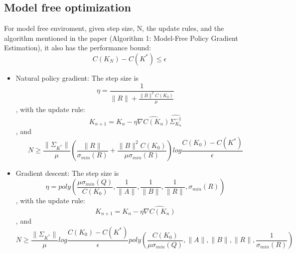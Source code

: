 \subsection{Model free optimization}
\begin{theorem}
For model free enviroment, given step size, N, the update rules, and the algorithm mentioned in the paper (Algorithm 1: Model-Free Policy Gradient Estimation), it also has the performance bound:
\begin{equation}
    C(K_N)-C(K^*)\leq\epsilon
\end{equation}\newline
\begin{itemize}
    \item Natural policy gradient:
The step size is
\begin{equation}
\eta = \frac{1}{\|R\|+\frac{\|B\|^2C(K_0)}{\mu}}
\end{equation}\newline
, with the update rule:
\begin{equation}
{K_{n+1}} = {K_n} - \eta\hat{\nabla{C}({K_n})}\hat{\Sigma_{K_n}^{-1}}
\end{equation}\newline
, and 
\begin{equation}
N\geq\frac{\|\Sigma_{K^*}\|}{\mu}(\frac{\|R\|}{\sigma_{min}(R)}+\frac{\|B\|^2C(K_0)}{\mu\sigma_{min}(R)})log\frac{C(K_0)-C(K^*)}{\epsilon}
\end{equation}\newline   
    \item Gradient descent:\newline
The step size is 
\begin{equation}
\eta = poly(\frac{\mu\sigma_{min}(Q)}{C(K_0)},\frac{1}{\|A\|},\frac{1}{\|B\|},\frac{1}{\|R\|},\sigma_{min}(R))
\end{equation}\newline
, with the update rule:
\begin{equation}
{K_{n+1}} = {K_n} - \eta\hat{\nabla{C}({K_n})}
\end{equation}\newline
, and 
\begin{equation}
N\geq\frac{\|\Sigma_{K^*}\|}{\mu}log\frac{C(K_0)-C(K^*)}{\epsilon}poly(\frac{C(K_0)}{\mu\sigma_{min}(Q)},\|A\|,\|B\|,\|R\|,\frac{1}{\sigma_{min}(R)})
\end{equation}\newline
\end{itemize}
\end{theorem}